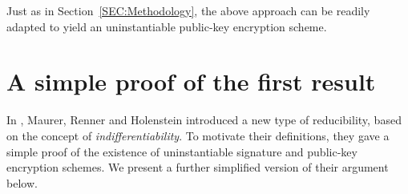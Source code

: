 Just as in Section~\ref{SEC:Methodology}, the above approach can be readily
adapted to yield an uninstantiable public-key encryption scheme.

\section{A simple proof of the first result}
In \cite{maurer:indiffability}, Maurer, Renner and Holenstein introduced a new
type of reducibility, based on the concept of {\it indifferentiability}. 
To motivate their definitions, they gave a simple
proof of the existence of uninstantiable signature and public-key encryption
schemes. We present a further simplified version of their argument below.


